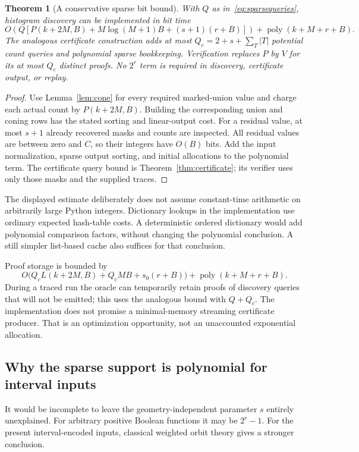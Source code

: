 \documentclass[11pt,letterpaper]{article}
\newtheorem{theorem}{Theorem}[section]
\newcommand{\poly}{\operatorname{poly}}
\begin{document}
\begin{theorem}[A conservative sparse bit bound]
\label{thm:bits}
With $Q$ as in~\eqref{eq:sparsequeries}, histogram discovery can be implemented
in bit time
\begin{equation}
\label{eq:bitbound}
 O\!\left(
 Q\left[P(k+2M,B)+M\log(M+1)B+(s+1)(r+B)\right]
 \right)
 +\poly(k+M+r+B).
\end{equation}
The analogous certificate construction adds at most
$Q_c=2+s+\sum_T|T|$ potential count queries and polynomial sparse bookkeeping.
Verification replaces $P$ by $V$ for its at most $Q_c$ distinct proofs.
No $2^r$ term is required in discovery, certificate output, or replay.
\end{theorem}
\begin{proof}
Use Lemma~\ref{lem:cone} for every required marked-union value and charge each
actual count by $P(k+2M,B)$. Building the corresponding union and coning rows
has the stated sorting and linear-output cost. For a residual value, at most
$s+1$ already recovered masks and counts are inspected. All residual values
are between zero and $C$, so their integers have $O(B)$ bits. Add the input
normalization, sparse output sorting, and initial allocations to the polynomial
term. The certificate query bound is Theorem~\ref{thm:certificate}; its
verifier uses only those masks and the supplied traces.
\end{proof}

The displayed estimate deliberately does not assume constant-time arithmetic
on arbitrarily large Python integers. Dictionary lookups in the implementation
use ordinary expected hash-table costs. A deterministic ordered dictionary
would add polynomial comparison factors, without changing the polynomial
conclusion. A still simpler list-based cache also suffices for that conclusion.

Proof storage is bounded by
\[
 O\bigl(Q_cL(k+2M,B)+Q_cMB+s_0(r+B)\bigr)
 +\poly(k+M+r+B).
\]
During a traced run the oracle can temporarily retain proofs of discovery
queries that will not be emitted; this uses the analogous bound with $Q+Q_c$.
The implementation does not promise a minimal-memory streaming certificate
producer. That is an optimization opportunity, not an unaccounted exponential
allocation.

\subsection{Why the sparse support is polynomial for interval inputs}
It would be incomplete to leave the geometry-independent parameter $s$
entirely unexplained. For arbitrary positive Boolean functions it may be
$2^r-1$. For the present interval-encoded inputs, classical weighted orbit
theory gives a stronger conclusion.
\end{document}
